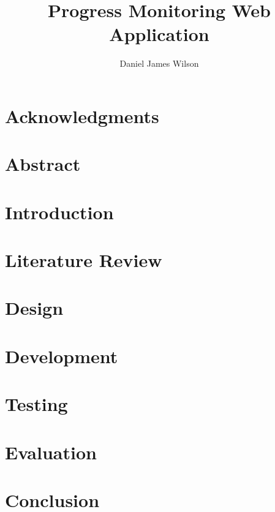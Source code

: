\documentclass[titlepage,a4paper,11pt,oneside]{book} %
\author{Daniel James Wilson}
\title{Progress Monitoring Web Application}
\begin{document}
\frontmatter %
\maketitle

\chapter{Acknowledgments}


\chapter{Abstract}


\tableofcontents
\listoffigures

\mainmatter %
\chapter{Introduction}
\label{sec:mainIntro}


\chapter{Literature Review}
\label{sec:litRev}


\chapter{Design}
\label{sec:design}


\chapter{Development}
\label{sec:dev}


\chapter{Testing}
\label{sec:test}


\chapter{Evaluation}
\label{sec:eval}


\chapter{Conclusion}
\label{sec:conc}


\pagebreak

\end{document}
